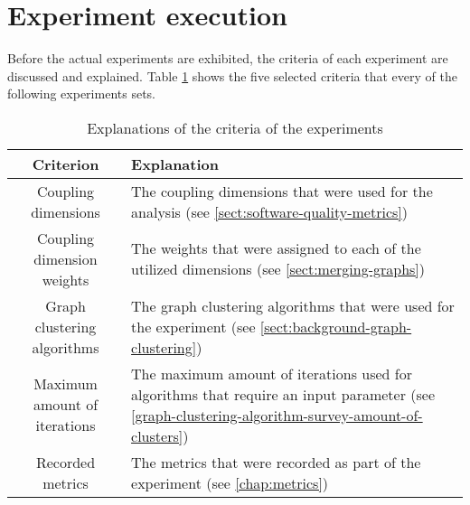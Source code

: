 \documentclass[12pt,a4paper]{report}
\begin{document}
\section{Experiment execution} \label{sect:experiment-execution}

Before the actual experiments are exhibited, the criteria of each experiment are discussed
and explained. Table \ref{table:experiment-criteria} shows the five selected criteria that
every of the following experiments sets.

\begin{table}[ht!]
\def\arraystretch{1.55}
\begin{tabularx}{\textwidth}{|c|X|}
\hline
Criterion & Explanation \\
\hline\hline

Coupling dimensions            & The coupling dimensions that were used for the analysis (see \ref{sect:software-quality-metrics}) \\\hline

Coupling dimension weights     & The weights that were assigned to each of the utilized dimensions (see \ref{sect:merging-graphs}) \\\hline

Graph clustering algorithms     & The graph clustering algorithms that were used for the experiment (see \ref{sect:background-graph-clustering}) \\\hline

Maximum amount of iterations    & The maximum amount of iterations used for algorithms that require an input parameter (see \ref{graph-clustering-algorithm-survey-amount-of-clusters}) \\\hline

Recorded metrics                & The metrics that were recorded as part of the experiment (see \ref{chap:metrics}) \\\hline

\end{tabularx}
\caption{Explanations of the criteria of the experiments}
\label{table:experiment-criteria}
\end{table}
\end{document}
